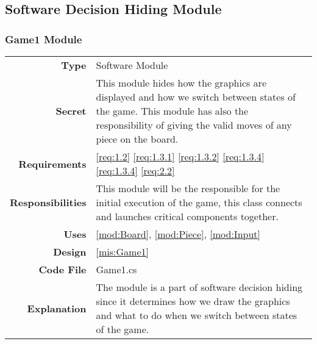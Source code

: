 \documentclass[10pt]{article}
\makeatletter
\newcommand{\CustomLabel}[1]{\Hy@raisedlink{\hypertarget{#1}{}}\label{#1}}
\makeatother
\begin{document}
\subsection{Software Decision Hiding Module}

    \subsubsection{Game1 Module}\CustomLabel{mod:Game1}
        \begin{tabularx}{\linewidth}{ >{\bfseries}r X }
            Type            & Software Module \\
            Secret          & This module hides how the graphics are displayed and how we switch between states of the game. This module has also the responsibility of giving the valid moves of any piece on the board. \\
	        Requirements	& \ref{req:1.2} \ref{req:1.3.1} \ref{req:1.3.2} \ref{req:1.3.4} \ref{req:1.3.4} \ref{req:2.2} \\
            Responsibilities & This module will be the responsible for the initial execution of the game, this class connects and launches critical components together. \\
            Uses            & \ref{mod:Board}, \ref{mod:Piece}, \ref{mod:Input} \\
            Design          & \ref{mis:Game1} \\
            Code File       & Game1.cs \\
            Explanation     & The module is a part of software decision hiding since it determines how we draw the graphics and what to do when we switch between states of the game. \\
        \end{tabularx}
        
\end{document}
